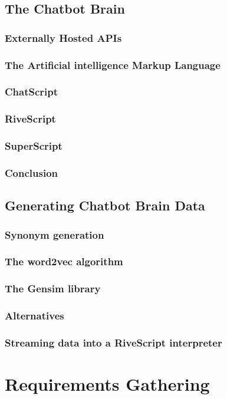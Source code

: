 \documentclass[12pt, twoside, a4paper, draft]{report}
\begin{document}
\section{The Chatbot Brain}
\subsection{Externally Hosted APIs}
\subsection{The Artificial intelligence Markup Language}
\subsection{ChatScript}
\subsection{RiveScript}
\subsection{SuperScript}
\subsection{Conclusion}
\section{Generating Chatbot Brain Data}
\subsection{Synonym generation}
\subsection{The word2vec algorithm}
\subsection{The Gensim library}
\subsection{Alternatives}
\subsection{Streaming data into a RiveScript interpreter}

\chapter{Requirements Gathering}
\end{document}
